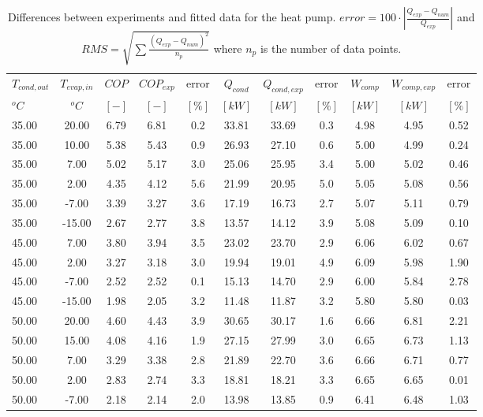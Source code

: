 \documentclass[english]{SPFShortReport}
\begin{document}
\begin{table}[!ht]
\begin{small}
\caption{Differences between experiments and fitted data for the heat pump.          $error=100 \cdot |\frac{Q_{exp}-Q_{num}}{Q_{exp}}|$ and $RMS = \sqrt { \sum{\frac{(Q_{exp}-Q_{num})^2}{n_p}} }$ where $n_p$ is the number of data points.}
\begin{center}
\resizebox{12cm}{!} 
{
\begin{tabular}{l | c c c c c c c c c c } 
\hline
\hline
$T_{cond,out}$ &$T_{evap,in}$ &$COP$ &$COP_{exp}$ &error &$Q_{cond}$ &$Q_{cond,exp}$ &error &$W_{comp}$ &$W_{comp,exp}$ &error \\ 
$^oC$ &$^oC$ &$[-]$ &$[-]$ &$[\%]$ &$[kW]$ &$[kW]$ &$[\%]$ &$[kW]$ &$[kW]$ &$[\%]$\\ 
\hline
35.00  & 20.00 & 6.79 & 6.81 & 0.2 & 33.81 & 33.69 & 0.3 & 4.98 & 4.95 & 0.52\\ 
35.00  & 10.00 & 5.38 & 5.43 & 0.9 & 26.93 & 27.10 & 0.6 & 5.00 & 4.99 & 0.24\\ 
35.00  & 7.00 & 5.02 & 5.17 & 3.0 & 25.06 & 25.95 & 3.4 & 5.00 & 5.02 & 0.46\\ 
35.00  & 2.00 & 4.35 & 4.12 & 5.6 & 21.99 & 20.95 & 5.0 & 5.05 & 5.08 & 0.56\\ 
35.00  & -7.00 & 3.39 & 3.27 & 3.6 & 17.19 & 16.73 & 2.7 & 5.07 & 5.11 & 0.79\\ 
35.00  & -15.00 & 2.67 & 2.77 & 3.8 & 13.57 & 14.12 & 3.9 & 5.08 & 5.09 & 0.10\\ 
45.00  & 7.00 & 3.80 & 3.94 & 3.5 & 23.02 & 23.70 & 2.9 & 6.06 & 6.02 & 0.67\\ 
45.00  & 2.00 & 3.27 & 3.18 & 3.0 & 19.94 & 19.01 & 4.9 & 6.09 & 5.98 & 1.90\\ 
45.00  & -7.00 & 2.52 & 2.52 & 0.1 & 15.13 & 14.70 & 2.9 & 6.00 & 5.84 & 2.78\\ 
45.00  & -15.00 & 1.98 & 2.05 & 3.2 & 11.48 & 11.87 & 3.2 & 5.80 & 5.80 & 0.03\\ 
50.00  & 20.00 & 4.60 & 4.43 & 3.9 & 30.65 & 30.17 & 1.6 & 6.66 & 6.81 & 2.21\\ 
50.00  & 15.00 & 4.08 & 4.16 & 1.9 & 27.15 & 27.99 & 3.0 & 6.65 & 6.73 & 1.13\\ 
50.00  & 7.00 & 3.29 & 3.38 & 2.8 & 21.89 & 22.70 & 3.6 & 6.66 & 6.71 & 0.77\\ 
50.00  & 2.00 & 2.83 & 2.74 & 3.3 & 18.81 & 18.21 & 3.3 & 6.65 & 6.65 & 0.01\\ 
50.00  & -7.00 & 2.18 & 2.14 & 2.0 & 13.98 & 13.85 & 0.9 & 6.41 & 6.48 & 1.03\\ 

\end{tabular}}
\end{center}
\end{small}
\end{table}
\end{document}
